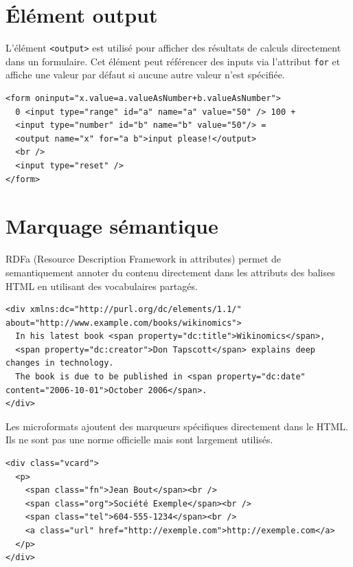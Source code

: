 \documentclass{report}
\begin{document}
\begin{multicols*}{2}
\section{Élément output}

\noindent
L'élément \texttt{<output>} est utilisé pour afficher des résultats de calculs directement dans un formulaire. Cet élément peut référencer des inputs via l'attribut \texttt{for} et affiche une valeur par défaut si aucune autre valeur n'est spécifiée.

\begin{lstlisting}[style=HTMLDraculaDark]
<form oninput="x.value=a.valueAsNumber+b.valueAsNumber">
  0 <input type="range" id="a" name="a" value="50" /> 100 +
  <input type="number" id="b" name="b" value="50"/> =
  <output name="x" for="a b">input please!</output>
  <br />
  <input type="reset" />
</form>
\end{lstlisting}


\section{Marquage sémantique}

RDFa (Resource Description Framework in attributes) permet de semantiquement annoter du contenu directement dans les attributs des balises HTML en utilisant des vocabulaires partagés.

\begin{lstlisting}[style=HTMLDraculaDark]
<div xmlns:dc="http://purl.org/dc/elements/1.1/" about="http://www.example.com/books/wikinomics">
  In his latest book <span property="dc:title">Wikinomics</span>,
  <span property="dc:creator">Don Tapscott</span> explains deep changes in technology.
  The book is due to be published in <span property="dc:date" content="2006-10-01">October 2006</span>.
</div>
\end{lstlisting}

\noindent
Les microformats ajoutent des marqueurs spécifiques directement dans le HTML. Ils ne sont pas une norme officielle mais sont largement utilisés.

\begin{lstlisting}[style=HTMLDraculaDark]
<div class="vcard">
  <p>
    <span class="fn">Jean Bout</span><br />
    <span class="org">Société Exemple</span><br />
    <span class="tel">604-555-1234</span><br />
    <a class="url" href="http://exemple.com">http://exemple.com</a>
  </p>
</div>
\end{lstlisting}



\end{multicols*}
\end{document}

